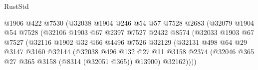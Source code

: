 \begin{lexlean}{RustStd}
\begin{coremodule}
                                  @1906
                                  @422
                                  @7530
                                  (@32038
                                    @1904
                                    @246
                                    @54
                                    @57
                                    @7528
                                    @2683
                                    (@32079
                                      @1904
                                      @54
                                      @7528
                                      (@32106
                                        @1903
                                        @67
                                        @2397
                                        @7527
                                        @2432
                                        @8574
                                        (@32033
                                          @1903
                                          @67
                                          @7527
                                          (@32116
                                            @1902
                                            @32
                                            @66
                                            @4496
                                            @7526
                                            @32129
                                            (@32131
                                              @498
                                              @64
                                              @29
                                              @3147
                                              @3160
                                              @32144
                                              (@32038
                                                @496
                                                @132
                                                @27
                                                @11
                                                @3158
                                                @2374
                                                (@32046
                                                  @365
                                                  @27
                                                  @365
                                                  @3158
                                                  (@8314 (@32051 @365))
                                                  @13900)
                                                @32162))))

\end{coremodule}
\end{lexlean}
